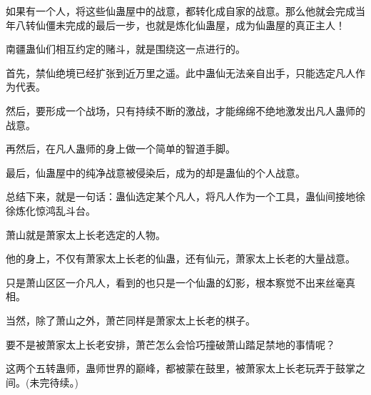 \begin{this_body}
如果有一个人，将这些仙蛊屋中的战意，都转化成自家的战意。那么他就会完成当年八转仙僵未完成的最后一步，也就是炼化仙蛊屋，成为仙蛊屋的真正主人！

南疆蛊仙们相互约定的赌斗，就是围绕这一点进行的。

首先，禁仙绝境已经扩张到近万里之遥。此中蛊仙无法亲自出手，只能选定凡人作为代表。

然后，要形成一个战场，只有持续不断的激战，才能绵绵不绝地激发出凡人蛊师的战意。

再然后，在凡人蛊师的身上做一个简单的智道手脚。

最后，仙蛊屋中的纯净战意被侵染后，成为的却是蛊仙的个人战意。

总结下来，就是一句话：蛊仙选定某个凡人，将凡人作为一个工具，蛊仙间接地徐徐炼化惊鸿乱斗台。

萧山就是萧家太上长老选定的人物。

他的身上，不仅有萧家太上长老的仙蛊，还有仙元，萧家太上长老的大量战意。

只是萧山区区一介凡人，看到的也只是一个仙蛊的幻影，根本察觉不出来丝毫真相。

当然，除了萧山之外，萧芒同样是萧家太上长老的棋子。

要不是被萧家太上长老安排，萧芒怎么会恰巧撞破萧山踏足禁地的事情呢？

这两个五转蛊师，蛊师世界的巅峰，都被蒙在鼓里，被萧家太上长老玩弄于鼓掌之间。(未完待续。)

\end{this_body}

